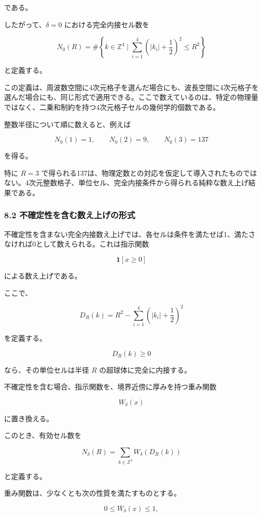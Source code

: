 \documentclass[
]{ltjsarticle}
\begin{document}
である。

したがって、\(\delta=0\) における完全内接セル数を

\[
N_0(R)
=
\#\left\{
k\in\mathbb{Z}^4
\mid
\sum_{i=1}^{4}
\left(|k_i|+\frac12\right)^2
\le R^2
\right\}
\]

と定義する。

この定義は、周波数空間に4次元格子を選んだ場合にも、波長空間に4次元格子を選んだ場合にも、同じ形式で適用できる。ここで数えているのは、特定の物理量ではなく、二乗和制約を持つ4次元格子セルの幾何学的個数である。

整数半径について順に数えると、例えば

\[
N_0(1)=1,\qquad
N_0(2)=9,\qquad
N_0(3)=137
\]

を得る。

特に \(R=3\)
で得られる137は、物理定数との対応を仮定して導入されたものではない。4次元整数格子、単位セル、完全内接条件から得られる純粋な数え上げ結果である。

\subsubsection{8.2
不確定性を含む数え上げの形式}\label{ux4e0dux78baux5b9aux6027ux3092ux542bux3080ux6570ux3048ux4e0aux3052ux306eux5f62ux5f0f}

不確定性を含まない完全内接数え上げでは、各セルは条件を満たせば1、満たさなければ0として数えられる。これは指示関数

\[
\mathbf{1}[x\ge 0]
\]

による数え上げである。

ここで、

\[
D_R(k)
=
R^2-
\sum_{i=1}^{4}
\left(|k_i|+\frac12\right)^2
\]

を定義する。

\[
D_R(k)\ge0
\]

なら、その単位セルは半径 \(R\) の超球体に完全に内接する。

不確定性を含む場合、指示関数を、境界近傍に厚みを持つ重み関数

\[
W_\delta(x)
\]

に置き換える。

このとき、有効セル数を

\[
N_\delta(R)
=
\sum_{k\in\mathbb{Z}^4}
W_\delta\!\left(
D_R(k)
\right)
\]

と定義する。

重み関数は、少なくとも次の性質を満たすものとする。

\[
0\le W_\delta(x)\le1,
\]
\end{document}
